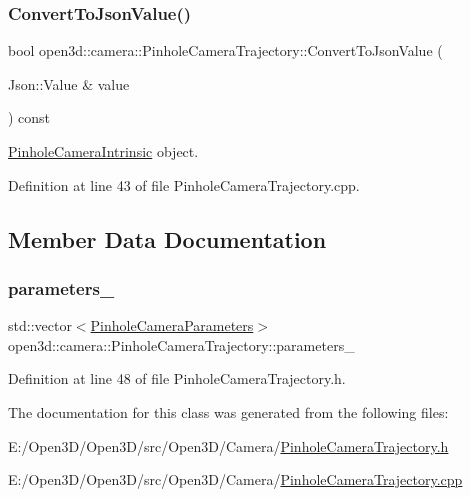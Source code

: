 \subsubsection{\texorpdfstring{ConvertToJsonValue()}{ConvertToJsonValue()}}
{\footnotesize\ttfamily bool open3d\+::camera\+::\+Pinhole\+Camera\+Trajectory\+::\+Convert\+To\+Json\+Value (\begin{DoxyParamCaption}\item[{Json\+::\+Value \&}]{value }\end{DoxyParamCaption}) const\hspace{0.3cm}{\ttfamily [override]}}



\mbox{\hyperlink{classopen3d_1_1camera_1_1_pinhole_camera_intrinsic}{Pinhole\+Camera\+Intrinsic}} object. 



Definition at line 43 of file Pinhole\+Camera\+Trajectory.\+cpp.



\subsection{Member Data Documentation}
\mbox{\label{classopen3d_1_1camera_1_1_pinhole_camera_trajectory_a97289c86dbb9c354c592cd741ecf4eea}} 
\subsubsection{\texorpdfstring{parameters\_}{parameters\_}}
{\footnotesize\ttfamily std\+::vector$<$\mbox{\hyperlink{classopen3d_1_1camera_1_1_pinhole_camera_parameters}{Pinhole\+Camera\+Parameters}}$>$ open3d\+::camera\+::\+Pinhole\+Camera\+Trajectory\+::parameters\+\_\+}



Definition at line 48 of file Pinhole\+Camera\+Trajectory.\+h.



The documentation for this class was generated from the following files\+:\begin{DoxyCompactItemize}
\item 
E\+:/\+Open3\+D/\+Open3\+D/src/\+Open3\+D/\+Camera/\mbox{\hyperlink{_pinhole_camera_trajectory_8h}{Pinhole\+Camera\+Trajectory.\+h}}\item 
E\+:/\+Open3\+D/\+Open3\+D/src/\+Open3\+D/\+Camera/\mbox{\hyperlink{_pinhole_camera_trajectory_8cpp}{Pinhole\+Camera\+Trajectory.\+cpp}}\end{DoxyCompactItemize}
